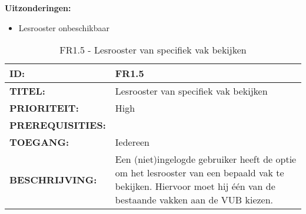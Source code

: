 \textbf{Uitzonderingen:}
\begin{itemize}
\item Lesrooster onbeschikbaar
\end{itemize}


\noindent\begin{table}[H]
            \begin{tabular}{l | p{10cm}}
                \textbf{ID:} & FR1.5 \\ \hline
                \textbf{TITEL:} & Lesrooster van specifiek vak bekijken \\ \hline
                \textbf{PRIORITEIT:} &  High \\ \hline
                \textbf{PREREQUISITIES:} & \\ \hline
                \textbf{TOEGANG:} &  Iedereen \\ \hline
                \textbf{BESCHRIJVING:} & Een (niet)ingelogde gebruiker heeft de optie om het lesrooster van een bepaald vak te bekijken. 
                                        Hiervoor moet hij \'{e}\'{e}n van de bestaande vakken aan de VUB kiezen.\\
            \end{tabular}\\
            \caption{FR1.5 - Lesrooster van specifiek vak bekijken}
            \label{tab:FR1.5 - Lesrooster van specifiek vak bekijken}
        \end{table}

